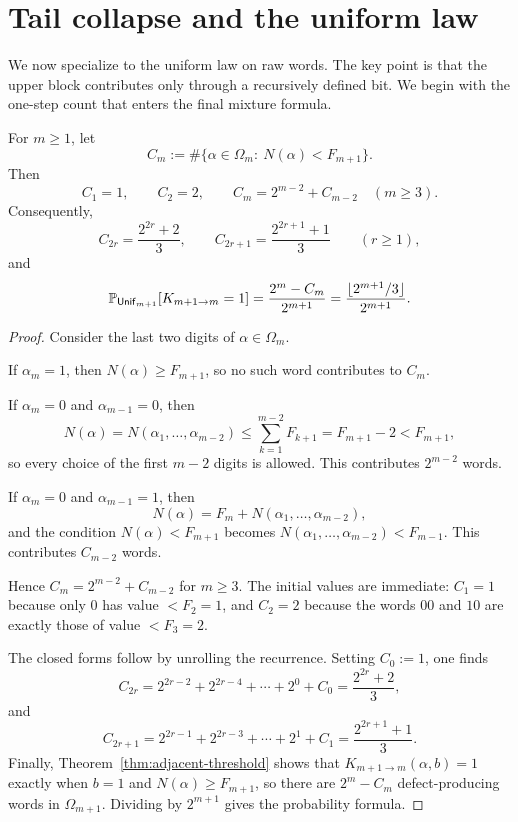 \section{Tail collapse and the uniform law}
\label{sec:uniform}

We now specialize to the uniform law on raw words.  The key point is that the
upper block contributes only through a recursively defined bit.  We begin with
the one-step count that enters the final mixture formula.

\begin{proposition}
\label{thm:explicit-count}
For $m\ge 1$, let
\[
C_m:=\#\{\alpha\in\Omega_m:\ N(\alpha)<F_{m+1}\}.
\]
Then
\[
C_1=1,
\qquad
C_2=2,
\qquad
C_m=2^{m-2}+C_{m-2}\quad (m\ge 3).
\]
Consequently,
\[
C_{2r}=\frac{2^{2r}+2}{3},
\qquad
C_{2r+1}=\frac{2^{2r+1}+1}{3}
\qquad (r\ge 1),
\]
and
\[
\mathbb{P}_{\mathsf{Unif}_{m+1}}[K_{m+1\to m}=1]
=
\frac{2^m-C_m}{2^{m+1}}
=
\frac{\lfloor 2^{m+1}/3\rfloor}{2^{m+1}}.
\]
\end{proposition}

\begin{proof}
Consider the last two digits of $\alpha\in\Omega_m$.

If $\alpha_m=1$, then $N(\alpha)\ge F_{m+1}$, so no such word contributes to
$C_m$.

If $\alpha_m=0$ and $\alpha_{m-1}=0$, then
\[
N(\alpha)=N(\alpha_1,\dots,\alpha_{m-2})
\le
\sum_{k=1}^{m-2}F_{k+1}
=
F_{m+1}-2
<
F_{m+1},
\]
so every choice of the first $m-2$ digits is allowed.  This contributes
$2^{m-2}$ words.

If $\alpha_m=0$ and $\alpha_{m-1}=1$, then
\[
N(\alpha)=F_m+N(\alpha_1,\dots,\alpha_{m-2}),
\]
and the condition $N(\alpha)<F_{m+1}$ becomes
$N(\alpha_1,\dots,\alpha_{m-2})<F_{m-1}$.  This contributes $C_{m-2}$ words.

Hence $C_m=2^{m-2}+C_{m-2}$ for $m\ge 3$.  The initial values are immediate:
$C_1=1$ because only $0$ has value $<F_2=1$, and $C_2=2$ because the words
$00$ and $10$ are exactly those of value $<F_3=2$.

The closed forms follow by unrolling the recurrence.  Setting $C_0:=1$, one
finds
\[
C_{2r}=2^{2r-2}+2^{2r-4}+\cdots+2^0+C_0=\frac{2^{2r}+2}{3},
\]
and
\[
C_{2r+1}=2^{2r-1}+2^{2r-3}+\cdots+2^1+C_1=\frac{2^{2r+1}+1}{3}.
\]
Finally, Theorem~\ref{thm:adjacent-threshold} shows that
$K_{m+1\to m}(\alpha,b)=1$ exactly when $b=1$ and $N(\alpha)\ge F_{m+1}$, so
there are $2^m-C_m$ defect-producing words in $\Omega_{m+1}$.  Dividing by
$2^{m+1}$ gives the probability formula.
\end{proof}


